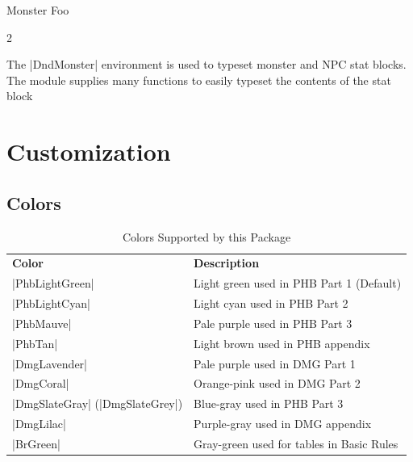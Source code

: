 \documentclass[letterpaper,twocolumn,openany,nodeprecatedcode]{dndbook}
\begin{document}
\begin{DndMonster}[float*=b,width=\textwidth + 8pt]{Monster Foo}
\begin{multicols}{2}
    \begin{DndMonsterLegendaryActions}
    \end{DndMonsterLegendaryActions}
  \end{multicols}
\end{DndMonster}

The |DndMonster| environment is used to typeset monster and NPC stat blocks. The module supplies many functions to easily typeset the contents of the stat block

\part{Customization}

\chapter{Colors}

\begin{table}[b]
  \caption{\DndFontTableTitle{}Colors Supported by this Package}\label{tab:colors}

  \begin{tabularx}{\linewidth}{lX}
    \textbf{Color}                  & \textbf{Description} \\
    \rowcolor{PhbLightGreen}
    |PhbLightGreen|                 & Light green used in PHB Part 1 (Default) \\
    \rowcolor{PhbLightCyan}
    |PhbLightCyan|                  & Light cyan used in PHB Part 2 \\
    \rowcolor{PhbMauve}
    |PhbMauve|                      & Pale purple used in PHB Part 3 \\
    \rowcolor{PhbTan}
    |PhbTan|                        & Light brown used in PHB appendix \\
    \rowcolor{DmgLavender}
    |DmgLavender|                   & Pale purple used in DMG Part 1 \\
    \rowcolor{DmgCoral}
    |DmgCoral|                      & Orange-pink used in DMG Part 2 \\
    \rowcolor{DmgSlateGray}
    |DmgSlateGray| (|DmgSlateGrey|) & Blue-gray used in PHB Part 3 \\
    \rowcolor{DmgLilac}
    |DmgLilac|                      & Purple-gray used in DMG appendix \\
    \rowcolor{BrGreen}
    |BrGreen|                       & Gray-green used for tables in Basic Rules\\
  \end{tabularx}
\end{table}
\end{document}
